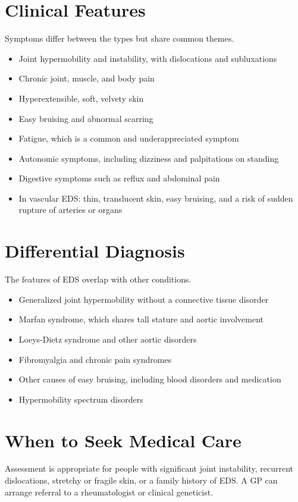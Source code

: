 \section*{Clinical Features}
Symptoms differ between the types but share common themes.
\begin{itemize}
    \item Joint hypermobility and instability, with dislocations and subluxations
    \item Chronic joint, muscle, and body pain
    \item Hyperextensible, soft, velvety skin
    \item Easy bruising and abnormal scarring
    \item Fatigue, which is a common and underappreciated symptom
    \item Autonomic symptoms, including dizziness and palpitations on standing
    \item Digestive symptoms such as reflux and abdominal pain
    \item In vascular EDS: thin, translucent skin, easy bruising, and a risk of sudden rupture of arteries or organs
\end{itemize}

\section*{Differential Diagnosis}
The features of EDS overlap with other conditions.
\begin{itemize}
    \item Generalized joint hypermobility without a connective tissue disorder
    \item Marfan syndrome, which shares tall stature and aortic involvement
    \item Loeys-Dietz syndrome and other aortic disorders
    \item Fibromyalgia and chronic pain syndromes
    \item Other causes of easy bruising, including blood disorders and medication
    \item Hypermobility spectrum disorders
\end{itemize}

\section*{When to Seek Medical Care}
Assessment is appropriate for people with significant joint instability, recurrent dislocations, stretchy or fragile skin, or a family history of EDS. A GP can arrange referral to a rheumatologist or clinical geneticist.

